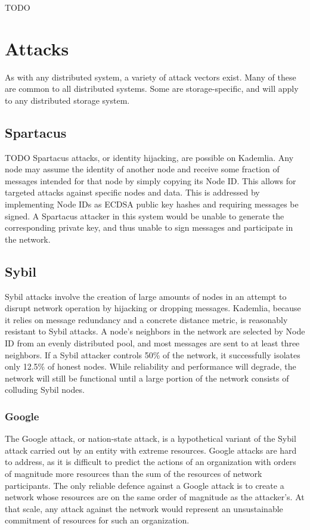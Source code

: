 \documentclass[a4paper,10pt]{article} \usepackage[utf8]{inputenc}
\newcommand{\todo}[1]{{\color{red} TODO #1}}
\begin{document}
\todo{}

\newpage \appendix

\section{Attacks}

As with any distributed system, a variety of attack vectors exist. Many of these
are common to all distributed systems. Some are storage-specific, and will apply
to any distributed storage system.

\subsection{Spartacus}

\todo{ Spartacus attacks, or identity hijacking, are possible on Kademlia. Any
node may assume the identity of another node and receive some fraction of
messages intended for that node by simply copying its Node ID. This allows for
targeted attacks against specific nodes and data. This is addressed by
implementing Node IDs as ECDSA public key hashes and requiring messages be
signed. A Spartacus attacker in this system would be unable to generate the
corresponding private key, and thus unable to sign messages and participate in
the network. }

\subsection{Sybil}

Sybil attacks involve the creation of large amounts of nodes in an attempt to
disrupt network operation by hijacking or dropping messages. Kademlia, because
it relies on message redundancy and a concrete distance metric, is reasonably
resistant to Sybil attacks. A node’s neighbors in the network are selected by
Node ID from an evenly distributed pool, and most messages are sent to at least
three neighbors. If a Sybil attacker controls 50\% of the network, it
successfully isolates only 12.5\% of honest nodes. While reliability and
performance will degrade, the network will still be functional until a large
portion of the network consists of colluding Sybil nodes.

\subsubsection{Google}

The Google attack, or nation-state attack, is a hypothetical variant of the
Sybil attack carried out by an entity with extreme resources. Google attacks are
hard to address, as it is difficult to predict the actions of an organization
with orders of magnitude more resources than the sum of the resources of network
participants. The only reliable defence against a Google attack is to create a
network whose resources are on the same order of magnitude as the attacker’s. At
that scale, any attack against the network would represent an unsustainable
commitment of resources for such an organization.
\end{document}
